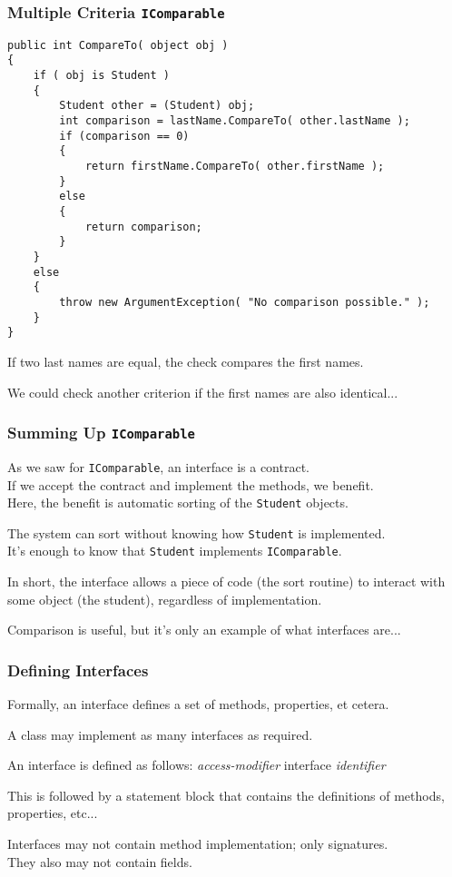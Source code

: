 \begin{frame}[fragile]
\frametitle{Multiple Criteria \texttt{IComparable}}

{\scriptsize
\begin{verbatim}
public int CompareTo( object obj )
{
    if ( obj is Student )
    {
        Student other = (Student) obj;
        int comparison = lastName.CompareTo( other.lastName );
        if (comparison == 0)
        {
            return firstName.CompareTo( other.firstName );
        }
        else
        {
            return comparison;
        }
    }
    else
    {
        throw new ArgumentException( "No comparison possible." ); 
    }
}
\end{verbatim}
}

If two last names are equal, the check compares the first names.

We could check another criterion if the first names are also identical...

\end{frame}

\begin{frame}
\frametitle{Summing Up \texttt{IComparable}}
As we saw for \texttt{IComparable}, an interface is a contract.\\
\quad If we accept the contract and implement the methods, we benefit.\\
\quad Here, the benefit is automatic sorting of the \texttt{Student} objects.

The system can sort without knowing how \texttt{Student} is implemented.\\
\quad It's enough to know that \texttt{Student} implements \texttt{IComparable}.

In short, the interface allows a piece of code (the sort routine) to interact with some object (the student), regardless of implementation.

Comparison is useful, but it's only an example of what interfaces are...

\end{frame}


\begin{frame}
\frametitle{Defining Interfaces}

Formally, an interface defines a set of methods, properties, et cetera.

A class may implement as many interfaces as required.

An interface is defined as follows:
\textit{access-modifier} interface \textit{identifier}

This is followed by a statement block that contains the definitions of methods, properties, etc...

Interfaces may not contain method implementation; only signatures.\\
\quad They also may not contain fields.

\end{frame}

